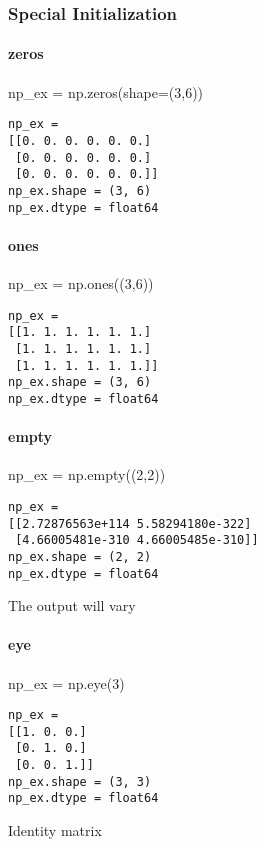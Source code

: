 \subsubsection{Special Initialization}

\paragraph{zeros}

\begin{python}
np_ex = np.zeros(shape=(3,6))
\end{python}
\begin{lstlisting}[style=pyOutStyle]
np_ex = 
[[0. 0. 0. 0. 0. 0.]
 [0. 0. 0. 0. 0. 0.]
 [0. 0. 0. 0. 0. 0.]]
np_ex.shape = (3, 6)
np_ex.dtype = float64
\end{lstlisting}

\paragraph{ones}

\begin{python}
np_ex = np.ones((3,6))
\end{python}
\begin{lstlisting}[style=pyOutStyle]
np_ex = 
[[1. 1. 1. 1. 1. 1.]
 [1. 1. 1. 1. 1. 1.]
 [1. 1. 1. 1. 1. 1.]]
np_ex.shape = (3, 6)
np_ex.dtype = float64
\end{lstlisting}


\paragraph{empty}

\begin{python}
np_ex = np.empty((2,2))
\end{python}
\begin{lstlisting}[style=pyOutStyle]
np_ex = 
[[2.72876563e+114 5.58294180e-322]
 [4.66005481e-310 4.66005485e-310]]
np_ex.shape = (2, 2)
np_ex.dtype = float64
\end{lstlisting}
\begin{markdown}
The output will vary
\end{markdown}


\paragraph{eye}

\begin{python}
np_ex = np.eye(3)
\end{python}
\begin{lstlisting}[style=pyOutStyle]
np_ex = 
[[1. 0. 0.]
 [0. 1. 0.]
 [0. 0. 1.]]
np_ex.shape = (3, 3)
np_ex.dtype = float64
\end{lstlisting}
\begin{markdown}
Identity matrix
\end{markdown}



